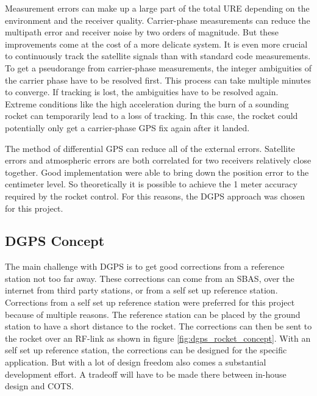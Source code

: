 Measurement errors can make up a large part of the total URE depending on the environment and the receiver quality.
Carrier-phase measurements can reduce the multipath error and receiver noise by two orders of magnitude.
But these improvements come at the cost of a more delicate system.
It is even more crucial to continuously track the satellite signals than with standard code measurements.
To get a pseudorange from carrier-phase measurements, the integer ambiguities of the carrier phase have to be resolved first.
This process can take multiple minutes to converge.
If tracking is lost, the ambiguities have to be resolved again.
Extreme conditions like the high acceleration during the burn of a sounding rocket can temporarily lead to a loss of tracking.
In this case, the rocket could potentially only get a carrier-phase GPS fix again after it landed.

The method of differential GPS can reduce all of the external errors.
Satellite errors and atmospheric errors are both correlated for two receivers relatively close together.
Good implementation were able to bring down the position error to the centimeter level.
So theoretically it is possible to achieve the 1 meter accuracy required by the rocket control.
For this reasons, the DGPS approach was chosen for this project.

\subsection{DGPS Concept}

The main challenge with DGPS is to get good corrections from a reference station not too far away.
These corrections can come from an SBAS, over the internet from third party stations, or from a self set up reference station.
Corrections from a self set up reference station were preferred for this project because of multiple reasons.
The reference station can be placed by the ground station to have a short distance to the rocket.
The corrections can then be sent to the rocket over an RF-link as shown in figure \ref{fig:dgps_rocket_concept}.
With an self set up reference station, the corrections can be designed for the specific application.
But with a lot of design freedom also comes a substantial development effort.
A tradeoff will have to be made there between in-house design and COTS.

